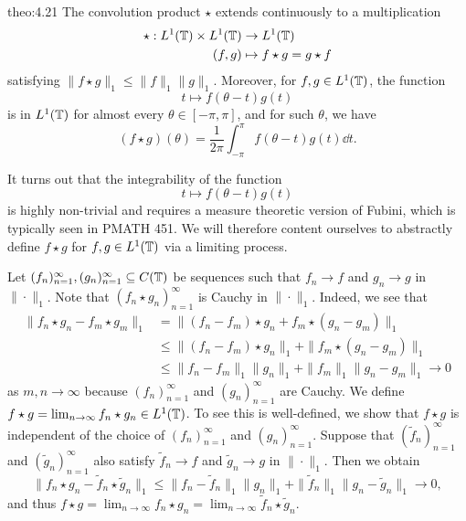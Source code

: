 \begin{theo}{theo:4.21}
    The convolution product $\star$ extends continuously to a multiplication 
    \begin{align*}
        \star : L^1(\mathbb{T}) \times L^1(\mathbb{T}) &\to L^1(\mathbb{T}) \\ 
        (f, g) &\mapsto f \star g = g \star f
    \end{align*}
    satisfying $\|f \star g\|_1 \leq \|f\|_1 \|g\|_1$. Moreover, for $f, g \in L^1(\mathbb{T})$, 
    the function 
    \[ t \mapsto f(\theta - t) g(t) \] 
    is in $L^1(\mathbb{T})$ for almost every $\theta \in [-\pi, \pi]$, and for such 
    $\theta$, we have 
    \[ (f \star g)(\theta) = \frac{1}{2\pi} \int_{-\pi}^\pi f(\theta - t)g(t)\dd t. \] 
\end{theo}
\begin{pf}
    It turns out that the integrability of the function 
    \[ t \mapsto f(\theta - t) g(t) \] 
    is highly non-trivial and requires a measure theoretic version of 
    Fubini, which is typically seen in PMATH 451. We will therefore 
    content ourselves to abstractly define $f \star g$ for 
    $f, g \in L^1(\mathbb{T})$ via a limiting process. 

    Let $(f_n)_{n=1}^\infty, (g_n)_{n=1}^\infty \subseteq C(\mathbb{T})$ 
    be sequences such that $f_n \to f$ and $g_n \to g$ in $\|\cdot\|_1$. 
    Note that $(f_n \star g_n)_{n=1}^\infty$ is Cauchy in $\|\cdot\|_1$. 
    Indeed, we see that  
    \begin{align*}
        \|f_n \star g_n - f_m \star g_m\|_1 
        &= \|(f_n - f_m) \star g_n + f_m \star (g_n - g_m)\|_1 \\ 
        &\leq \|(f_n - f_m) \star g_n\|_1 + \|f_m \star (g_n - g_m)\|_1 \\ 
        &\leq \|f_n - f_m\|_1 \|g_n\|_1 + \|f_m\|_1 \|g_n - g_m\|_1 \to 0 
    \end{align*}
    as $m, n \to \infty$ because $(f_n)_{n=1}^\infty$ and $(g_n)_{n=1}^\infty$ 
    are Cauchy. We define $f \star g = \lim_{n\to\infty} 
    f_n \star g_n \in L^1(\mathbb{T})$. To see this is well-defined, we show that 
    $f \star g$ is independent of the choice of $(f_n)_{n=1}^\infty$ 
    and $(g_n)_{n=1}^\infty$. Suppose that $(\tilde f_n)_{n=1}^\infty$ 
    and $(\tilde g_n)_{n=1}^\infty$ also satisfy $\tilde f_n \to f$ and 
    $\tilde g_n \to g$ in $\|\cdot\|_1$. Then we obtain 
    \[ \|f_n \star g_n - \tilde f_n \star \tilde g_n\|_1 
    \leq \|f_n - \tilde f_n\|_1 \|g_n\|_1 + \|\tilde f_n\|_1 
    \|g_n - \tilde g_n\|_1 \to 0, \] 
    and thus $f \star g = \lim_{n\to\infty} f_n \star g_n = 
    \lim_{n\to\infty} \tilde f_n \star \tilde g_n$. 
\end{pf}
